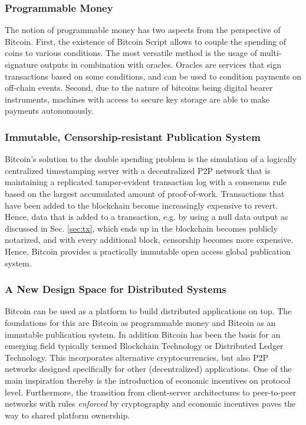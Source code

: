\subsubsection{Programmable Money}

The notion of programmable money has two aspects from the perspective of Bitcoin. First, the existence of Bitcoin Script allows to couple the spending of coins to various conditions. The most versatile method is the usage of multi-signature outputs in combination with oracles. Oracles are services that sign transactions based on some conditions, and can be used to condition payments on off-chain events. Second, due to the nature of bitcoins being digital bearer instruments, machines with access to secure key storage are able to make payments autonomously.  

\subsubsection{Immutable, Censorship-resistant Publication System}

Bitcoin's solution to the double spending problem is the simulation of a logically centralized timestamping server with a decentralized P2P network that is maintaining a replicated tamper-evident transaction log with a consensus rule based on the largest accumulated amount of proof-of-work. Transactions that have been added to the blockchain become increasingly expensive to revert. Hence, data that is added to a transaction, e.g. by using a null data output as discussed in Sec. \ref{sec:tx}, which ends up in the blockchain becomes publicly notarized, and with every additional block, censorship becomes more expensive. Hence, Bitcoin provides a practically immutable open access global publication system.

\subsubsection{A New Design Space for Distributed Systems}

Bitcoin can be used as a platform to build distributed applications on top. The foundations for this are Bitcoin as programmable money and Bitcoin as an immutable publication system. In addition Bitcoin has been the basis for an emerging field typically termed Blockchain Technology or Distributed Ledger Technology. This incorporates alternative cryptocurrencies, but also P2P networks designed specifically for other (decentralized) applications. One of the main inspiration thereby is the introduction of economic incentives on protocol level. Furthermore, the transition from client-server architectures to peer-to-peer networks with rules \emph{enforced} by cryptography and economic incentives paves the way to shared platform ownership.


